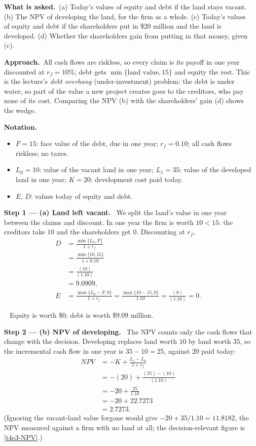 \documentclass[11pt,a4paper]{article}
\newcommand{\notation}{\par\noindent\textbf{Notation.}}
\newcommand{\step}[2]{\par\medskip\noindent\textbf{Step #1 --- #2.}~}
\newcommand{\asked}{\par\medskip\noindent\textbf{What is asked.}~}
\newcommand{\approach}{\par\smallskip\noindent\textbf{Approach.}~}
\newcommand{\answer}[1]{\par\smallskip\noindent\fbox{\textbf{Answer #1.}}~}
\begin{document}
\asked (a) Today's values of equity and debt if the land stays vacant. (b) The NPV of developing
the land, for the firm as a whole. (c) Today's values of equity and debt if the shareholders put in
\$20 million and the land is developed. (d) Whether the shareholders gain from putting in that
money, given (c).

\approach All cash flows are riskless, so every claim is its payoff in one year discounted at
$r_f=10\%$; debt gets $\min\{\text{land value},15\}$ and equity the rest. This is the lecture's
\emph{debt overhang} (under-investment) problem: the debt is under water, so part of the value a
new project creates goes to the creditors, who pay none of its cost. Comparing the NPV (b) with the
shareholders' gain (d) shows the wedge.

\notation
\begin{itemize}
  \item $F=15$: face value of the debt, due in one year; $r_f=0.10$; all cash flows riskless; no taxes.
  \item $L_0=10$: value of the vacant land in one year; $L_1=35$: value of the developed land in one year; $K=20$: development cost paid today.
  \item $E$, $D$: values today of equity and debt.
\end{itemize}

\step{1}{(a) Land left vacant} We split the land's value in one year between the claims and
discount. In one year the firm is worth $10<15$: the creditors take $10$ and the shareholders get
$0$. Discounting at $r_f$,
\begin{align}
  D &= \frac{\min\{L_0,F\}}{1+r_f} \label{t4e3-Da}\\
    &= \frac{\min\{10,15\}}{1+0.10} \nonumber\\
    &= \frac{(10)}{(1.10)} \nonumber\\
    &= 9.0909, \nonumber\\
  E &= \frac{\max\{L_0-F,0\}}{1+r_f} = \frac{\max\{10-15,0\}}{1.10} = \frac{(0)}{(1.10)} = 0. \nonumber
\end{align}

\answer{(a)} Equity is worth \$0; debt is worth \$9.09 million.

\step{2}{(b) NPV of developing} The NPV counts only the cash flows that change with the decision.
Developing replaces land worth $10$ by land worth $35$, so the incremental cash flow in one year is
$35-10=25$, against $20$ paid today:
\begin{align}
  \mathit{NPV} &= -K+\frac{L_1-L_0}{1+r_f} \label{t4e3-NPV}\\
      &= -(20)+\frac{(35)-(10)}{(1.10)} \nonumber\\
      &= -20+\frac{25}{1.10} \nonumber\\
      &= -20+22.7273 \nonumber\\
      &= 2.7273. \nonumber
\end{align}
(Ignoring the vacant-land value forgone would give $-20+35/1.10=11.8182$, the NPV measured
against a firm with no land at all; the decision-relevant figure is \eqref{t4e3-NPV}.)
\end{document}

